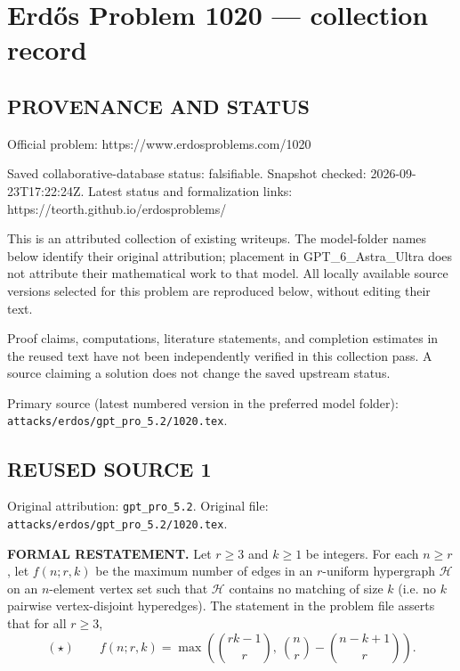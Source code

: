 \section*{Erd\H{o}s Problem 1020 --- collection record}

\subsection*{PROVENANCE AND STATUS}
Official problem: https://www.erdosproblems.com/1020

Saved collaborative-database status: falsifiable.
Snapshot checked: 2026-09-23T17:22:24Z.
Latest status and formalization links: https://teorth.github.io/erdosproblems/

This is an attributed collection of existing writeups. The model-folder names below identify their original attribution; placement in GPT\_6\_Astra\_Ultra does not attribute their mathematical work to that model. All locally available source versions selected for this problem are reproduced below, without editing their text.

Proof claims, computations, literature statements, and completion estimates in the reused text have not been independently verified in this collection pass. A source claiming a solution does not change the saved upstream status.

Primary source (latest numbered version in the preferred model folder): \texttt{attacks/erdos/gpt\_pro\_5.2/1020.tex}.

\subsection*{REUSED SOURCE 1}
Original attribution: \texttt{gpt\_pro\_5.2}.
Original file: \texttt{attacks/erdos/gpt\_pro\_5.2/1020.tex}.


\noindent\textbf{FORMAL RESTATEMENT.}
Let $r\ge 3$ and $k\ge 1$ be integers.
For each $n\ge r$, let $f(n;r,k)$ be the maximum number of edges in an $r$-uniform hypergraph $\mathcal{H}$ on an $n$-element vertex set such that $\mathcal{H}$ contains no matching of size $k$ (i.e. no $k$ pairwise vertex-disjoint hyperedges).
The statement in the problem file asserts that for all $r\ge 3$,
\[
(\star)\qquad f(n;r,k)=\max\left(\binom{rk-1}{r},\ \binom{n}{r}-\binom{n-k+1}{r}\right).
\]

